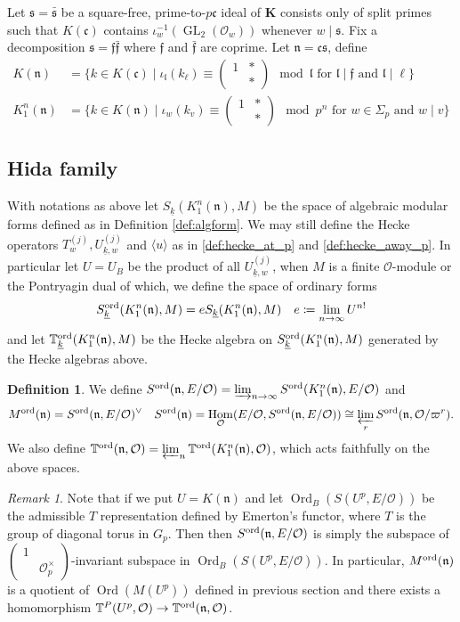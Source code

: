 \documentclass[leqno]{amsart}
\newcommand{\smat}[1]{\left( \begin{smallmatrix} #1 \end{smallmatrix} \right)}
\newcommand{\wt}[1]{\underline{ #1 }}
\newcommand{\TT}{\mathbb{T}} %
\DeclareMathOperator{\Ord}{Ord}
\newcommand{\ord}{\textnormal{ord}}
\DeclareMathOperator{\GL}{GL}
\newcommand{\K}{{\mathbf{K}}} %
\newcommand{\oo}{\mathcal{O}} %
\newcommand{\fc}{\mathfrak{c}}
\newcommand{\fs}{\mathfrak{s}}
\newcommand{\fn}{\mathfrak{n}}
\newcommand{\fl}{\mathfrak{l}}
\newcommand{\ff}{\mathfrak{f}}
\DeclareMathOperator{\Hom}{Hom}
\theoremstyle{definition}
\newtheorem{defn}[thm]{Definition}
\theoremstyle{remark}
\newtheorem{rem}[thm]{Remark}
\begin{document}
Let $\fs=\bar{\fs}$ be a
square-free, prime-to-$p\fc$
ideal of  $\K$ consists only of split primes
such that  $K(\fc)$
contains  $\iota_w^{-1}(\GL_2(\oo_w))$
whenever $w\mid \fs$.
Fix a decomposition $\fs=\ff\bar{\ff}$ where
$\ff$ and  $ \bar{\ff}$ are coprime.
Let $\fn=\fc\fs$, define
\begin{align}
	K(\fn)&=
	\{
	k\in K(\fc)\mid
	\iota_{\fl}(k_\ell)\equiv
	(\begin{smallmatrix}
		1&*\\&*
	\end{smallmatrix})\mod \fl
	\text{ for } \fl\mid \ff
	\text{ and } \fl\mid \ell
	\}\\
	K_1^n(\fn)&=
	\{
	k\in K(\fn)\mid
	\iota_{w}(k_v)\equiv
	(\begin{smallmatrix}
		1&*\\&*
	\end{smallmatrix})\mod p^n
	\text{ for } w\in \Sigma_p
	\text{ and } w\mid v
	\}
\end{align}


\subsection{Hida family}

With notations as above
let $S_{\wt{k}}(K^n_1(\fn),M)$
be the space of algebraic modular forms
defined as in Definition \ref{def:algform}.
We may still define the Hecke operators
$T_w^{(j)}, U_{\wt{k},w}^{(j)}$
and $\langle u\rangle$ as in 
\eqref{def:hecke_at_p} and
\eqref{def:hecke_away_p}.
In particular let 
$U=U_B$ be the product of all $U_{\wt{k},w}^{(j)}$,
when $M$ is a finite $\oo$-module
or the Pontryagin dual of which,
we define the space of ordinary forms
\[
	S_{\wt{k}}^{\ord}(K^n_1(\fn),M)=
	eS_{\wt{k}}(K^n_1(\fn),M)\quad
	e\coloneqq \lim_{n\to \infty}U^{n!}
\]
and let 
$\TT^{\ord}_{\wt{k}}(K^n_1(\fn),M)$ 
be the Hecke algebra on
$S_{\wt{k}}^{\ord}(K^n_1(\fn),M)$
generated by the Hecke algebras above.

\begin{defn}\label{def:ord_space}
	We define 
	$S^{\ord}(\fn,E/\oo)=\varinjlim_{n\to \infty}
	S^{\ord}(K^n_1(\fn),E/\oo)$ and 
\begin{equation}
	M^{\ord}(\fn)=
	S^{\ord}(\fn,E/\oo)^\vee\quad
	S^{\ord}(\fn)=\Hom_\oo(E/\oo, S^{\ord}(\fn,E/\oo))
	\cong \varprojlim_r S^{\ord}(\fn,\oo/\varpi^r).
\end{equation}
We also  define 
$\TT^{\ord}(\fn,\oo)=\varprojlim_n
\TT^{\ord}(K^n_1(\fn),\oo)$,
which acts faithfully on the above spaces.
\end{defn}
\begin{rem}
Note that if we put $U=K(\fn)$
and let $\Ord_B(S(U^p,E/\oo))$
be the admissible $T$ representation
defined by Emerton's functor,
where  $T$ is the group of diagonal torus in  $G_p$.
Then
then $S^{\ord}(\fn,E/\oo)$ is simply
the subspace of 
$\smat{1&\\&\oo_p^\times}$-invariant subspace
in $\Ord_B(S(U^p,E/\oo))$.
In particular, $M^{\ord}(\fn)$
is a quotient of $\Ord(M(U^p))$ 
defined in previous section
and there exists a homomorphism
$\TT^P(U^p,\oo)\to \TT^{\ord}(\fn,\oo)$.
\end{rem}
\end{document}
